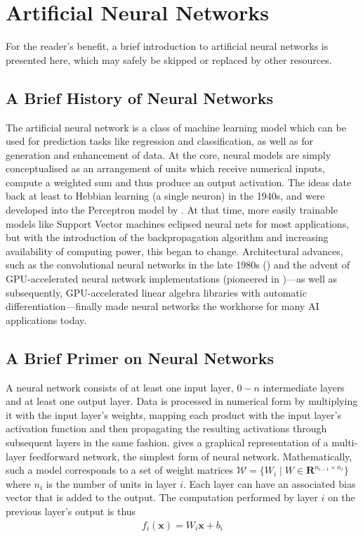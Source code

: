 \hypertarget{sec:anns}{%
\section{Artificial Neural Networks}\label{sec:anns}}

For the reader's benefit, a brief introduction to artificial neural networks is
presented here, which may safely be skipped or replaced by other resources.

\subsection*{A Brief History of Neural Networks}%

The artificial neural network is a class of machine learning model which can be
used for prediction tasks like regression and classification, as well as for
generation and enhancement of data.  At the core, neural models are simply
conceptualised as an arrangement of units which receive numerical inputs,
compute a weighted sum and thus produce an output activation. The ideas date
back at least to Hebbian learning (a single neuron) in the 1940s, and were
developed into the Perceptron model by \citet{Rosenblatt58theperceptron}. At
that time, more easily trainable models like Support Vector machines eclipsed
neural nets for most applications, but with the introduction of the
backpropagation algorithm \citep{werbos1975beyond} and increasing availability
of computing power, this began to change.  Architectural advances, such as the
convolutional neural networks in the late 1980s (\citep{lecun1989generalization,
LeCun:1989:BAH:1351079.1351090}) and the advent of GPU-accelerated neural
network implementations (pioneered in \cite{Ciresan11flexible})---as well as
subsequently, GPU-accelerated linear algebra libraries with automatic
differentiation---finally made neural networks the workhorse for many AI
applications today.

\subsection*{A Brief Primer on Neural Networks}%

A neural network consists of at least one input layer, \(0-n\)
intermediate layers and at least one output layer. Data is processed in
numerical form by multiplying it with the input layer's weights, mapping
each product with the input layer's activation function and then
propagating the resulting activations through subsequent layers in the
same fashion.  gives a graphical representation of a
multi-layer feedforward network, the simplest form of neural network.
Mathematically, such a model corresponds to a set of weight matrices
$\mathcal{W} = \{W_i \mid W \in \mathbf{R}^{n_{i-1} \times n_i}\}$ where $n_i$
is the number of units in layer $i$. Each layer can have an associated bias
vector that is added to the output. The computation performed by layer $i$ on
the previous layer's output is
thus
\begin{align}
    f_i(\mathbf{x}) = W_i \mathbf{x} + b_i
\end{align}

